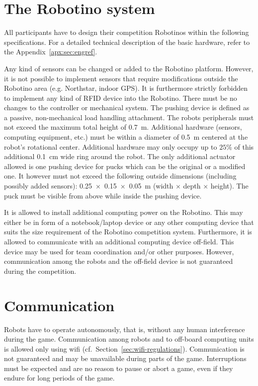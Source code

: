 \documentclass[12pt,twoside]{article}
\newcommand{\Robotino}{Robotino}
\newcommand{\refsec}[1]{Section~\ref{#1}}
\begin{document}

\section{The Robotino system} \label{sec:robotino}

All participants have to design their competition Robotinos within the
following specifications. For a detailed technical description of the
basic hardware, refer to the Appendix~\ref{apx:sec:engref}.

Any kind of sensors can be changed or added to the Robotino platform.
However, it is not possible to implement sensors that require
modifications outside the Robotino area (e.g. Northstar, indoor GPS).
It is furthermore strictly forbidden to implement any kind of RFID
device into the Robotino. There must be no changes to the controller
or mechanical system. The pushing device is defined as a passive,
non-mechanical load handling attachment. The robots peripherals must
not exceed the maximum total height of \SI{0.7}{\metre}. Additional
hardware (sensors, computing equipment, etc.) must be within a
diameter of \SI{0.5}{\metre} centered at the robot's rotational
center. Additional hardware may only occupy up to $25\%$ of this
additional \SI{0.1}{\centi\metre} wide ring around the robot.  The
only additional actuator allowed is one pushing device for pucks which
can be the original or a modified one. It however must not exceed the
following outside dimensions (including possibly added sensors):
\SI{0.25 x 0.15 x 0.05}{\metre} (width $\times$ depth $\times$
height). The puck must be visible from above while inside the pushing
device.

It is allowed to install additional computing power on the
\Robotino. This may either be in form of a notebook/laptop device or
any other computing device that suits the size requirement of the
\Robotino{} competition system. Furthermore, it is allowed to
communicate with an additional computing device off-field. This device
may be used for team coordination and/or other purposes. However,
communication among the robots and the off-field device is not
guaranteed during the competition.


\section{Communication}
Robots have to operate autonomously, that is, without any human
interference during the game. Communication among robots and to
off-board computing units is allowed only using wifi
(cf.~\refsec{sec:wifi-regulations}). Communication is not guaranteed
and may be unavailable during parts of the game. Interruptions must be
expected and are no reason to pause or abort a game, even if they
endure for long periods of the game.
\end{document}
